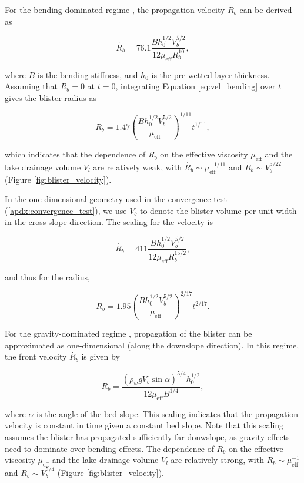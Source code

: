 \documentclass[draft]{agujournal2019}
\newcommand{\figref}[1]{Figure \ref{#1}}
\newcommand{\appref}[1]{\ref{#1}}
\newcommand{\eqnref}[1]{Equation \ref{#1}}
\begin{document}
For the bending-dominated regime \cite{peng2020Viscous}, the propagation velocity $\dot{R_b}$ can be derived as
\begin{linenomath*}
\begin{equation}\label{eq:vel_bending}
    \dot{R_b} = 76.1 \frac{B h_0^{1/2} V_b^{5/2}}{12\mu_{\text{eff}}R_b^{10}},
\end{equation}
\end{linenomath*}
where $B$ is the bending stiffness, and $h_0$ is the pre-wetted layer thickness. Assuming that $R_b=0$ at $t=0$, integrating \eqnref{eq:vel_bending} over $t$ gives the blister radius as
\begin{linenomath*}
\begin{equation}\label{eq:rb_bending}
    R_b = 1.47 \left(\frac{B h_0^{1/2} V_b^{5/2}}{\mu_{\text{eff}}}\right)^{1/11} t^{1/11},
\end{equation}
\end{linenomath*}
which indicates that the dependence of $\dot{R_b}$ on the effective viscosity $\mu_{\text{eff}}$ and the lake drainage volume $V_l$ are relatively weak, with $\dot{R_b}\sim \mu_{\text{eff}}^{-1/11}$ and $\dot{R_b}\sim V_b^{5/22}$ (\figref{fig:blister_velocity}). 

In the one-dimensional geometry used in the convergence test (\appref{apdx:convergence_test}), we use $V_b$ to denote the blister volume per unit width in the cross-slope direction. The scaling for the velocity is
\begin{linenomath*}
\begin{equation}\label{eq:vel_bending_1d}
    \dot{R_b} = 411 \frac{B h_0^{1/2} V_b^{5/2}}{12\mu_{\text{eff}}R_b^{15/2}},
\end{equation}
\end{linenomath*}
and thus for the radius,
\begin{linenomath*}
\begin{equation}\label{eq:rb_bending_1d}
    R_b = 1.95 \left(\frac{B h_0^{1/2} V_b^{5/2}}{\mu_{\text{eff}}}\right)^{2/17} t^{2/17}.
\end{equation}
\end{linenomath*}

For the gravity-dominated regime \cite{tobin2023Evolution}, propagation of the blister can be approximated as one-dimensional (along the downslope direction). In this regime, the front velocity $\dot{R_b}$ is given by
\begin{linenomath*}
\begin{equation}\label{eq:vel_gravity}
    \dot{R_b} = \frac{\left(\rho_w g V_b \sin{\alpha}\right)^{5/4} h_0^{1/2}}{12\mu_{\text{eff}} B^{1/4}},
\end{equation}
\end{linenomath*}
where $\alpha$ is the angle of the bed slope. This scaling indicates that the propagation velocity is constant in time given a constant bed slope. Note that this scaling assumes the blister has propagated sufficiently far donwslope, as gravity effects need to dominate over bending effects. The dependence of $\dot{R_b}$ on the effective viscosity $\mu_{\text{eff}}$ and the lake drainage volume $V_l$ are relatively strong, with $\dot{R_b}\sim \mu_{\text{eff}}^{-1}$ and $\dot{R_b}\sim V_b^{5/4}$ (\figref{fig:blister_velocity}).
\end{document}
